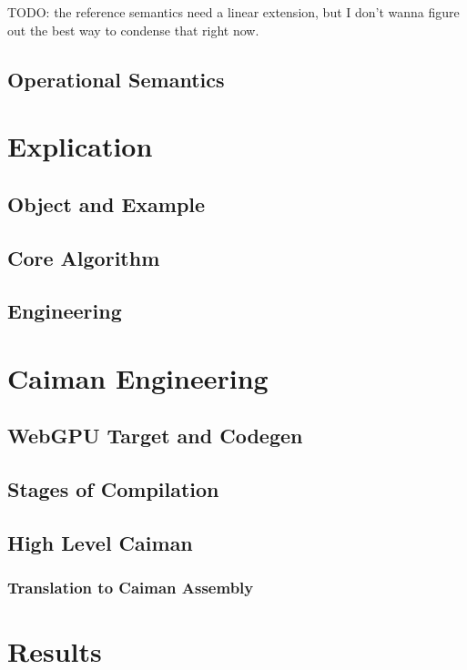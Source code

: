 TODO: the reference semantics need a linear extension, but I don't wanna figure out the best way to condense that right now.

\subsection{Operational Semantics}

\section{Explication}
\label{sec:explication}

\subsection{Object and Example}

\subsection{Core Algorithm}

\subsection{Engineering}

\section{Caiman Engineering}
\label{sec:engineering}

\subsection{WebGPU Target and Codegen}

\subsection{Stages of Compilation}

\subsection{High Level Caiman}

\subsubsection{Translation to Caiman Assembly}

\section{Results}
\label{sec:results}

